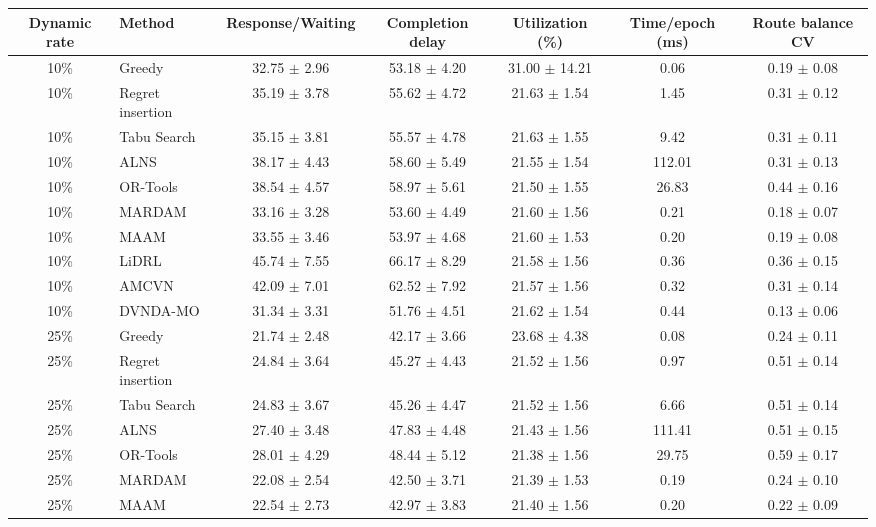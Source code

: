 \begin{tabular}{clccccc}
\toprule
Dynamic rate & Method & Response/Waiting & Completion delay & Utilization (\%) & Time/epoch (ms) & Route balance CV \\
\midrule
10\% & Greedy & 32.75 $\pm$ 2.96 & 53.18 $\pm$ 4.20 & 31.00 $\pm$ 14.21 & 0.06 & 0.19 $\pm$ 0.08 \\
10\% & Regret insertion & 35.19 $\pm$ 3.78 & 55.62 $\pm$ 4.72 & 21.63 $\pm$ 1.54 & 1.45 & 0.31 $\pm$ 0.12 \\
10\% & Tabu Search & 35.15 $\pm$ 3.81 & 55.57 $\pm$ 4.78 & 21.63 $\pm$ 1.55 & 9.42 & 0.31 $\pm$ 0.11 \\
10\% & ALNS & 38.17 $\pm$ 4.43 & 58.60 $\pm$ 5.49 & 21.55 $\pm$ 1.54 & 112.01 & 0.31 $\pm$ 0.13 \\
10\% & OR-Tools & 38.54 $\pm$ 4.57 & 58.97 $\pm$ 5.61 & 21.50 $\pm$ 1.55 & 26.83 & 0.44 $\pm$ 0.16 \\
10\% & MARDAM & 33.16 $\pm$ 3.28 & 53.60 $\pm$ 4.49 & 21.60 $\pm$ 1.56 & 0.21 & 0.18 $\pm$ 0.07 \\
10\% & MAAM & 33.55 $\pm$ 3.46 & 53.97 $\pm$ 4.68 & 21.60 $\pm$ 1.53 & 0.20 & 0.19 $\pm$ 0.08 \\
10\% & LiDRL & 45.74 $\pm$ 7.55 & 66.17 $\pm$ 8.29 & 21.58 $\pm$ 1.56 & 0.36 & 0.36 $\pm$ 0.15 \\
10\% & AMCVN & 42.09 $\pm$ 7.01 & 62.52 $\pm$ 7.92 & 21.57 $\pm$ 1.56 & 0.32 & 0.31 $\pm$ 0.14 \\
10\% & DVNDA-MO & 31.34 $\pm$ 3.31 & 51.76 $\pm$ 4.51 & 21.62 $\pm$ 1.54 & 0.44 & 0.13 $\pm$ 0.06 \\
25\% & Greedy & 21.74 $\pm$ 2.48 & 42.17 $\pm$ 3.66 & 23.68 $\pm$ 4.38 & 0.08 & 0.24 $\pm$ 0.11 \\
25\% & Regret insertion & 24.84 $\pm$ 3.64 & 45.27 $\pm$ 4.43 & 21.52 $\pm$ 1.56 & 0.97 & 0.51 $\pm$ 0.14 \\
25\% & Tabu Search & 24.83 $\pm$ 3.67 & 45.26 $\pm$ 4.47 & 21.52 $\pm$ 1.56 & 6.66 & 0.51 $\pm$ 0.14 \\
25\% & ALNS & 27.40 $\pm$ 3.48 & 47.83 $\pm$ 4.48 & 21.43 $\pm$ 1.56 & 111.41 & 0.51 $\pm$ 0.15 \\
25\% & OR-Tools & 28.01 $\pm$ 4.29 & 48.44 $\pm$ 5.12 & 21.38 $\pm$ 1.56 & 29.75 & 0.59 $\pm$ 0.17 \\
25\% & MARDAM & 22.08 $\pm$ 2.54 & 42.50 $\pm$ 3.71 & 21.39 $\pm$ 1.53 & 0.19 & 0.24 $\pm$ 0.10 \\
25\% & MAAM & 22.54 $\pm$ 2.73 & 42.97 $\pm$ 3.83 & 21.40 $\pm$ 1.56 & 0.20 & 0.22 $\pm$ 0.09 \\

\end{tabular}
